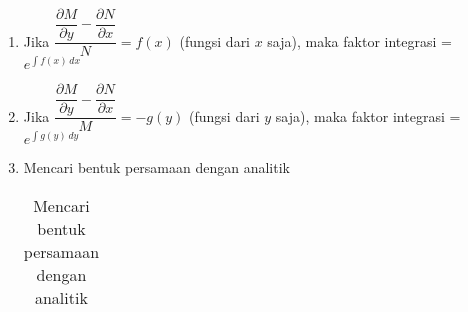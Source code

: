 \begin{enumerate}[1.]

	\item Jika \begin{math} \dfrac{\dfrac{\partial M}{\partial y} - \dfrac{\partial N}{\partial x}}{N} = f(x) \end{math} (fungsi dari \begin{math} x \end{math} saja), maka faktor integrasi = \begin{math} e^{\int f(x) \, dx} \end{math}
	\item Jika \begin{math} \dfrac{\dfrac{\partial M}{\partial y} - \dfrac{\partial N}{\partial x}}{M} = -g(y) \end{math} (fungsi dari \begin{math} y \end{math} saja), maka faktor integrasi = \begin{math} e^{\int g(y) \, dy} \end{math}
	\item Mencari bentuk persamaan dengan analitik

	\begin{table}[H]
	\centering
	\captionsetup{justification=centering}
	\caption{Mencari bentuk persamaan dengan analitik}

	\begin{tabular} { | c | c | c | }


\end{tabular}
\end{table}
\end{enumerate}
